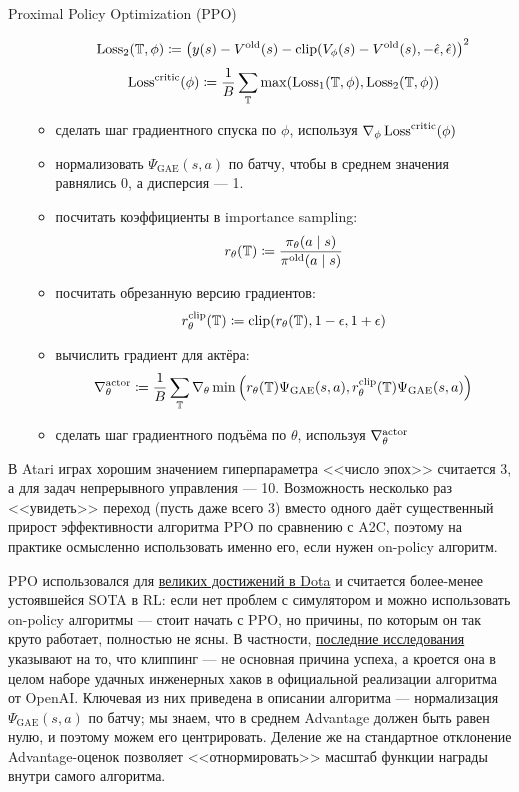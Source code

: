 \begin{algorithm}[label = PPOalgorithm]{Proximal Policy Optimization (PPO)}
\begin{enumerate}
\begin{itemize}
    $$\operatorname{Loss}_2(\mathbb{T}, \phi) \coloneqq \left( y(s) - V^{\mathrm{old}}(s) - \mathrm{clip}(V_\phi(s) - V^{\mathrm{old}}(s), -\hat{\epsilon}, \hat{\epsilon}) \right) ^2$$
    $$\operatorname{Loss}^{\mathrm{critic}}(\phi) \coloneqq \frac{1}{B}\sum_{\mathbb{T}} \max(\operatorname{Loss}_1(\mathbb{T}, \phi), \operatorname{Loss}_2(\mathbb{T}, \phi))$$
    \item сделать шаг градиентного спуска по $\phi$, используя $\nabla_\phi \operatorname{Loss}^{\mathrm{critic}}(\phi)$
    \item нормализовать $\Psi_{\mathrm{GAE}}(s, a)$ по батчу, чтобы в среднем значения равнялись 0, а дисперсия --- 1.
    \item посчитать коэффициенты в importance sampling:
    $$r_\theta(\mathbb{T}) \coloneqq \frac{\pi_\theta(a \mid s)}{\pi^{\mathrm{old}}(a \mid s)}$$
    \item посчитать обрезанную версию градиентов:
    $$r_\theta^{\mathrm{clip}}(\mathbb{T}) \coloneqq \mathrm{clip}(r_\theta(\mathbb{T}), 1 - \epsilon, 1 + \epsilon)$$
    \item вычислить градиент для актёра:
    $$\nabla^{\mathrm{actor}}_\theta \coloneqq \frac{1}{B}\sum_{\mathbb{T}} \nabla_\theta \min \left( r_\theta(\mathbb{T})\Psi_{\mathrm{GAE}}(s, a), r_\theta^{\mathrm{clip}}(\mathbb{T})\Psi_{\mathrm{GAE}}(s, a) \right) $$
    \item сделать шаг градиентного подъёма по $\theta$, используя $\nabla^{\mathrm{actor}}_\theta$
    \end{itemize}
\end{enumerate}
\end{algorithm}

\begin{remark}
В Atari играх хорошим значением гиперпараметра <<число эпох>> считается 3, а для задач непрерывного управления --- 10. Возможность несколько раз <<увидеть>> переход (пусть даже всего 3) вместо одного даёт существенный прирост эффективности алгоритма PPO по сравнению с A2C, поэтому на практике осмысленно использовать именно его, если нужен on-policy алгоритм.  
\end{remark}

\begin{remark}
PPO использовался для \href{https://openai.com/blog/openai-five/}{великих достижений в Dota} и считается более-менее устоявшейся SOTA в RL: если нет проблем с симулятором и можно использовать on-policy алгоритмы --- стоит начать с PPO, но причины, по которым он так круто работает, полностью не ясны. В частности, \href{https://openreview.net/forum?id=r1etN1rtPB}{последние исследования} указывают на то, что клиппинг --- не основная причина успеха, а кроется она в целом наборе удачных инженерных хаков в официальной реализации алгоритма от OpenAI. Ключевая из них приведена в описании алгоритма --- нормализация $\Psi_{\mathrm{GAE}}(s, a)$ по батчу; мы знаем, что в среднем Advantage должен быть равен нулю, и поэтому можем его центрировать. Деление же на стандартное отклонение Advantage-оценок позволяет <<отнормировать>> масштаб функции награды внутри самого алгоритма.
\end{remark}

